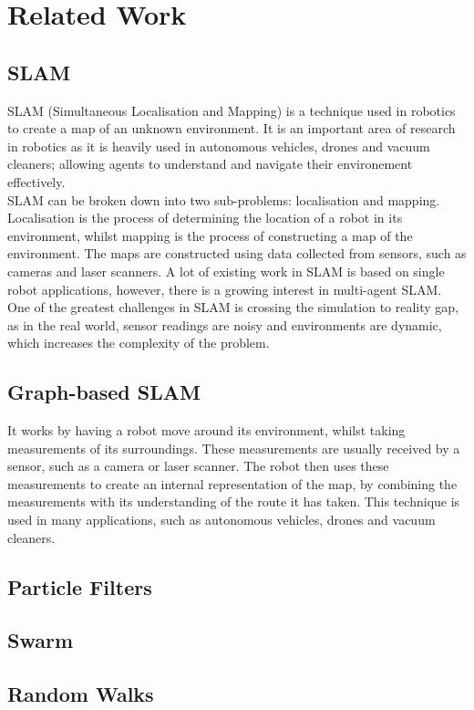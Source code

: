 \documentclass[12pt]{article}
\begin{document}
\section{Related Work}
\subsection{SLAM}
SLAM (Simultaneous Localisation and Mapping) is a technique used in robotics to create a map of an unknown environment.
It is an important area of research in robotics as it is heavily used in autonomous vehicles, drones and vacuum cleaners;
allowing agents to understand and navigate their environement effectively.\\
SLAM can be broken down into two sub-problems: localisation and mapping. Localisation is the process of determining the
location of a robot in its environment, whilst mapping is the process of constructing a map of the environment. The maps
are constructed using data collected from sensors, such as cameras and laser scanners. A lot of existing work in SLAM is
based on single robot applications, however, there is a growing interest in multi-agent SLAM. One of the greatest
challenges in SLAM is crossing the simulation to reality gap, as in the real world, sensor readings are noisy and
environments are dynamic, which increases the complexity of the problem.

\subsection{Graph-based SLAM}
It works by having a robot move around its environment, whilst taking measurements of its surroundings. These measurements
are usually received by a sensor, such as a camera or laser scanner. The robot then uses these measurements to create an
internal representation of the map, by combining the measurements with its understanding of the route it has taken. This
technique is used in many applications, such as autonomous vehicles, drones and vacuum cleaners.\\
\subsection{Particle Filters}
\subsection{Swarm}
\subsection{Random Walks}
\end{document}
